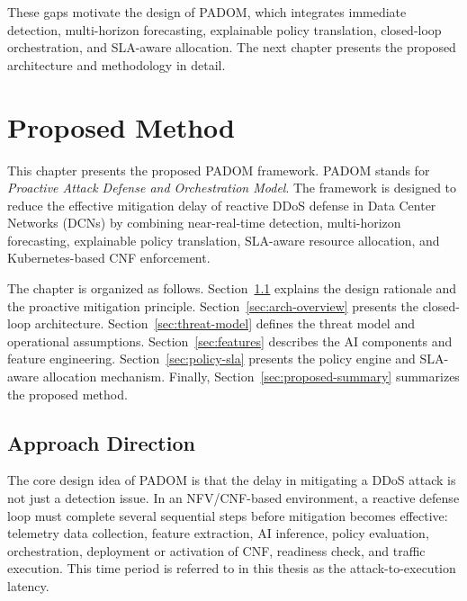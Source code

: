 \documentclass[12pt, a4paper, reqno, oneside]{book}
\newcommand{\padonap}{\textsc{PADOM}}
\begin{document}
These gaps motivate the design of \padonap{}, which integrates immediate
detection, multi-horizon forecasting, explainable policy translation,
closed-loop orchestration, and SLA-aware allocation. The next chapter presents
the proposed architecture and methodology in detail.

\chapter{Proposed Method}
\label{ch:proposed}

This chapter presents the proposed \padonap{} framework. \padonap{}
stands for \textit{Proactive Attack Defense and Orchestration Model}.
The framework is designed to reduce the effective
mitigation delay of reactive DDoS defense in Data Center Networks (DCNs)
by combining near-real-time detection, multi-horizon forecasting,
explainable policy translation, SLA-aware resource allocation, and
Kubernetes-based CNF enforcement.

The chapter is organized as follows. Section~\ref{sec:approach} explains
the design rationale and the proactive mitigation principle.
Section~\ref{sec:arch-overview} presents the closed-loop architecture.
Section~\ref{sec:threat-model} defines the threat model and operational
assumptions. Section~\ref{sec:features} describes the AI components and
feature engineering. Section~\ref{sec:policy-sla} presents the policy
engine and SLA-aware allocation mechanism. Finally,
Section~\ref{sec:proposed-summary} summarizes the proposed method.

\section{Approach Direction}
\label{sec:approach}
The core design idea of ​​\padonap{} is that the delay in mitigating a DDoS attack is not just a detection issue. In an NFV/CNF-based environment, a reactive defense loop must complete several sequential steps before mitigation becomes effective: telemetry data collection, feature extraction, AI inference, policy evaluation, orchestration, deployment or activation of CNF, readiness check, and traffic execution. This time period is referred to in this thesis as the attack-to-execution latency.
\end{document}
